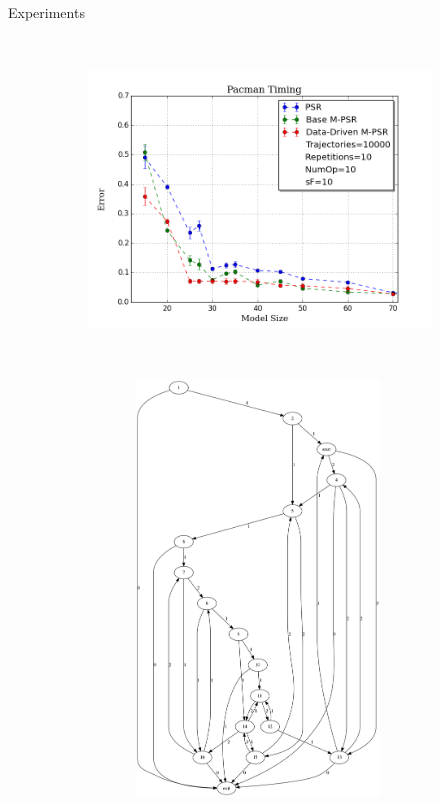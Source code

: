 \documentclass[final]{beamer}
\newlength{\onecolwid}
\begin{document}
\begin{frame}[t]
\begin{columns}[t]
\begin{column}{\onecolwid}
\begin{block}{Experiments}
\begin{figure}
\begin{subfigure}[b]{0.48\textwidth}
        \caption{}
      \end{subfigure}
      ~
      \begin{subfigure}[b]{0.48\textwidth}
        \includegraphics[width=\textwidth]{figs/Pacman/Pacman10k.png}
        \caption{}
      \end{subfigure}
      ~
      \begin{subfigure}[b]{0.48\textwidth}
        \includegraphics[height=11cm,width=9cm]{figs/Pacman/graphPacMan.png}
        \caption{}
      \end{subfigure}
      ~
      \begin{subfigure}[b]{0.48\textwidth}

\end{subfigure}
\end{figure}
\end{block}
\end{column}
\end{columns}
\end{frame}
\end{document}

